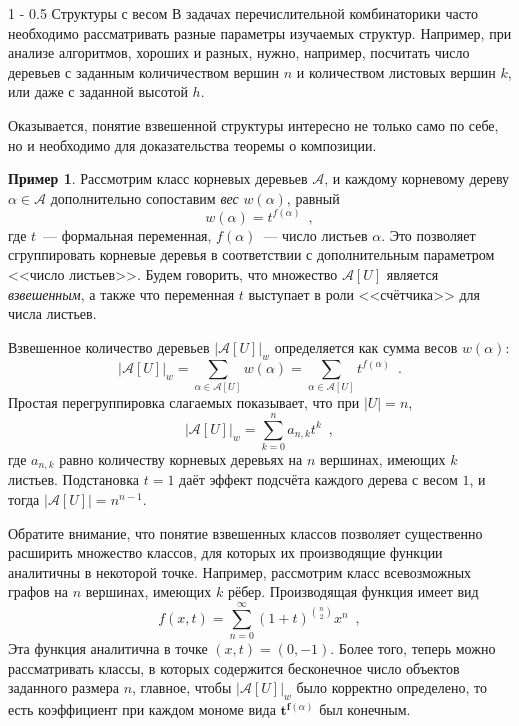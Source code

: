 \documentclass{article}
\makeatletter
\def \vec {\boldsymbol}
\theoremstyle{definition}
\newtheorem{example}{Пример}
\renewcommand{\section}{\@startsection
{section}%
{1}%
{\z@}%
{-\baselineskip}%
{0.5\baselineskip}%
{\centering\large\scshape}} %
\makeatother
\begin{document}
\section{Структуры с весом}
В задачах перечислительной комбинаторики часто необходимо рассматривать разные
параметры изучаемых структур. Например, при анализе алгоритмов, хороших и
разных, нужно, например, посчитать число деревьев с заданным количичеством
вершин \( n \) и количеством листовых вершин \( k \), или даже с заданной
высотой \( h \).

    Оказывается, понятие взвешенной структуры интересно не только само по себе,
но и необходимо для доказательства теоремы о композиции.

\begin{example}
    Рассмотрим класс корневых деревьев \( \mathcal A \), и каждому корневому
дереву \( \alpha \in \mathcal A \) дополнительно сопоставим \textit{вес} \(
w(\alpha) \), равный
\[
    w(\alpha) = t^{f(\alpha)} \enspace ,
\]
где \( t \)~--- формальная переменная, \( f(\alpha) \)~--- число листьев
\(\alpha\). Это позволяет сгруппировать корневые деревья в соответствии с
дополнительным параметром <<число листьев>>. Будем говорить, что множество \(
\mathcal A[U] \) является \textit{взвешенным}, а также что переменная \( t \)
выступает в роли <<счётчика>> для числа листьев.

Взвешенное количество деревьев \( |\mathcal A[U]|_w \) определяется как сумма
весов \( w(\alpha) \):
\[
    | \mathcal A[U] |_w = \sum_{\alpha \in \mathcal A[U]} w(\alpha) = \sum_{\alpha \in
\mathcal A[U]} t^{f(\alpha)} \enspace .
\]
Простая перегруппировка слагаемых показывает, что при \( |U| = n \),
\[
    | \mathcal A[U] |_w = \sum_{k=0}^n a_{n,k} t^k \enspace ,
\]
где \( a_{n,k}\) равно количеству корневых деревьях на \( n \) вершинах, имеющих
\( k \) листьев. Подстановка \( t = 1 \) даёт эффект подсчёта каждого дерева с
весом \( 1 \), и тогда \( | \mathcal A[U] | = n^{n-1} \).
\end{example}

Обратите внимание, что понятие взвешенных классов позволяет существенно
расширить множество классов, для которых их производящие функции аналитичны в
некоторой точке. Например, рассмотрим класс всевозможных графов на \( n \) вершинах,
имеющих \( k \) рёбер. Производящая функция имеет вид
\[
    f(x, t) = \sum_{n = 0}^\infty (1 + t)^{ {n \choose 2} } x^n \enspace ,
\]
Эта функция аналитична в точке \( (x, t) = (0, -1) \).
Более того, теперь можно рассматривать классы, в которых содержится бесконечное
число объектов заданного размера \( n \), главное, чтобы \( |\mathcal A[U]|_w \)
было корректно определено, то есть коэффициент при каждом мономе вида \( \vec
t^{\vec f(\alpha)} \) был конечным.
\end{document}
